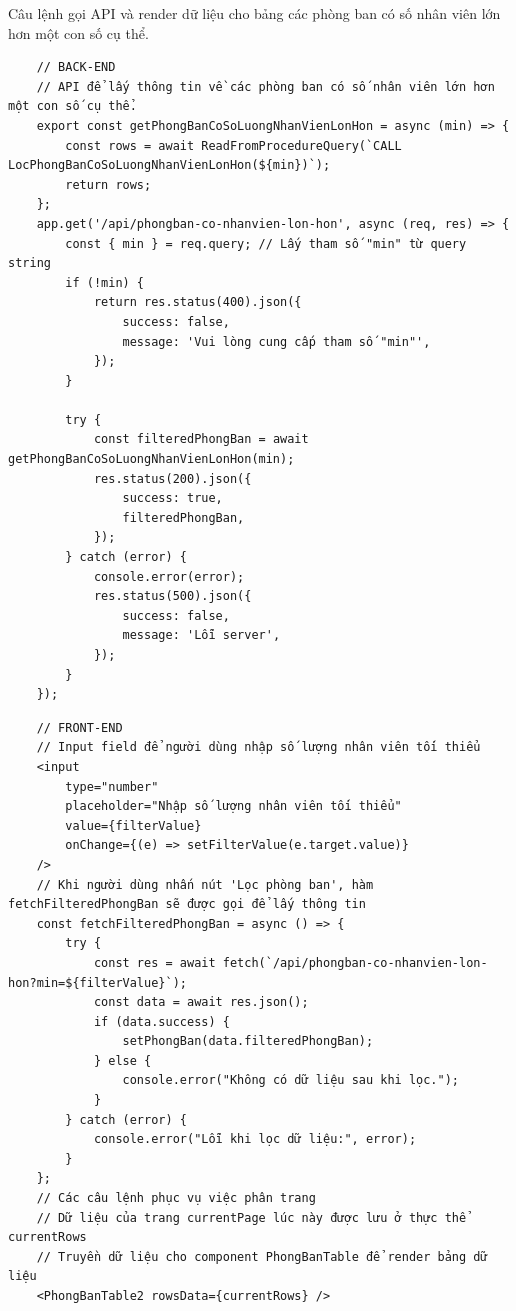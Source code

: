\newpage
Câu lệnh gọi API và render dữ liệu cho bảng các phòng ban có số nhân viên lớn hơn một con số cụ thể.
\begin{verbatim}
    // BACK-END
    // API để lấy thông tin về các phòng ban có số nhân viên lớn hơn một con số cụ thể.
    export const getPhongBanCoSoLuongNhanVienLonHon = async (min) => {
        const rows = await ReadFromProcedureQuery(`CALL LocPhongBanCoSoLuongNhanVienLonHon(${min})`);
        return rows;
    };
    app.get('/api/phongban-co-nhanvien-lon-hon', async (req, res) => {
        const { min } = req.query; // Lấy tham số "min" từ query string
        if (!min) {
            return res.status(400).json({
                success: false,
                message: 'Vui lòng cung cấp tham số "min"',
            });
        }

        try {
            const filteredPhongBan = await getPhongBanCoSoLuongNhanVienLonHon(min);
            res.status(200).json({
                success: true,
                filteredPhongBan,
            });
        } catch (error) {
            console.error(error);
            res.status(500).json({
                success: false,
                message: 'Lỗi server',
            });
        }
    });
\end{verbatim}
\begin{verbatim}
    // FRONT-END
    // Input field để người dùng nhập số lượng nhân viên tối thiểu
    <input
        type="number"
        placeholder="Nhập số lượng nhân viên tối thiểu"
        value={filterValue}
        onChange={(e) => setFilterValue(e.target.value)}
    />
    // Khi người dùng nhấn nút 'Lọc phòng ban', hàm fetchFilteredPhongBan sẽ được gọi để lấy thông tin 
    const fetchFilteredPhongBan = async () => {
        try {
            const res = await fetch(`/api/phongban-co-nhanvien-lon-hon?min=${filterValue}`);
            const data = await res.json();
            if (data.success) {
                setPhongBan(data.filteredPhongBan);
            } else {
                console.error("Không có dữ liệu sau khi lọc.");
            }
        } catch (error) {
            console.error("Lỗi khi lọc dữ liệu:", error);
        }
    };
    // Các câu lệnh phục vụ việc phân trang
    // Dữ liệu của trang currentPage lúc này được lưu ở thực thể currentRows
    // Truyền dữ liệu cho component PhongBanTable để render bảng dữ liệu
    <PhongBanTable2 rowsData={currentRows} />
\end{verbatim}

